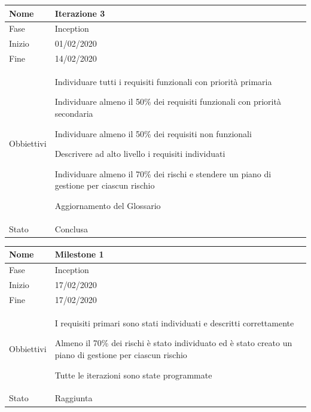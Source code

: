 \begin{center}
\begin{tabular}{ |p{2cm}|p{10cm}|  }
\hline
Nome & Iterazione 3 \\\hline
Fase & Inception \\\hline
Inizio & 01/02/2020 \\\hline
Fine &  14/02/2020 \\\hline
Obbiettivi & 
	\begin{compactitem}
		
		\item Individuare tutti i requisiti funzionali con priorità primaria
		\item Individuare almeno il 50\% dei requisiti funzionali con priorità secondaria
		\item Individuare almeno il 50\% dei requisiti non funzionali
		\item Descrivere ad alto livello i requisiti individuati
		\item Individuare almeno il 70\% dei rischi e stendere un piano di gestione per ciascun rischio
		\item Aggiornamento del Glossario
	\end{compactitem}\\\hline
Stato &  Conclusa \\\hline %
\end{tabular}
\label{table:3}\newline

\begin{tabular}{ |p{2cm}|p{10cm}|  }
\hline
Nome & Milestone 1\\\hline
Fase & Inception \\\hline
Inizio & 17/02/2020 \\\hline
Fine &  17/02/2020 \\\hline
Obbiettivi & 
	\begin{compactitem}
		\item I requisiti primari sono stati individuati e descritti correttamente
		\item Almeno il 70\% dei rischi è stato individuato ed è stato creato un piano di gestione per ciascun rischio
		\item Tutte le iterazioni sono state programmate
	\end{compactitem}\\\hline
Stato &  Raggiunta \\\hline
\end{tabular}
\label{table:milestone1}\newline


\end{center}
